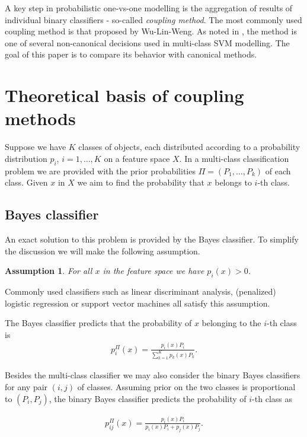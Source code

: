 \documentclass[twoside,11pt]{article}
\newtheorem{assumption}{Assumption}
\begin{document}
A key step in probabilistic one-vs-one modelling is the aggregation of results of individual binary classifiers - so-called \emph{coupling method}. The most commonly used coupling method is that proposed by Wu-Lin-Weng. As noted in \cite{dohau}, the method is one of several non-canonical decisions used in multi-class SVM modelling. The goal of this paper is to compare its behavior with canonical methods. 


\section{Theoretical basis of coupling methods}

Suppose we have $K$ classes of objects, each distributed according to a probability distribution $p_i$, $i=1,\ldots, K$ on a feature space $X$. In a multi-class classification problem we are provided with the prior probabilities $\Pi = (P_1, \ldots, P_k)$ of each class. Given $x$ in $X$ we aim to find the probability that $x$ belongs to $i$-th class. 


\subsection{Bayes classifier}

An exact solution to this problem is provided by the Bayes classifier. To simplify the discussion we will make the following assumption.


\begin{assumption} \label{ass:1}
 For all $x$ in the feature space we have $p_i(x) > 0$.
\end{assumption}
Commonly used classifiers such as linear discriminant analysis, (penalized) logistic regression or support vector machines all satisfy this assumption.

The Bayes classifier predicts that the probability of $x$ belonging to the $i$-th class is
\begin{align}
 p^\Pi_i(x) = \frac{p_i(x) P_i}{\sum_{k=1}^K p_k(x)P_k}.
\end{align}

Besides the multi-class classifier we may also consider the binary Bayes classifiers for any pair $(i,j)$ of classes. Assuming prior on the two classes is proportional to $(P_i, P_j)$, the binary Bayes classifier predicts the probability of $i$-th class as 

\begin{align}
	p_{ij}^\Pi(x) = \frac{p_i(x) P_i}{p_i(x)P_i + p_j(x)P_j}.
\end{align}
\end{document}
